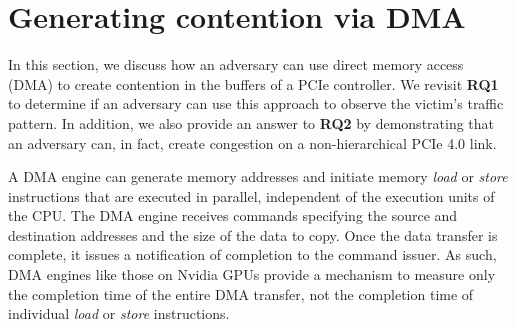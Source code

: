 \section{Generating contention via DMA}
\label{sec:interconnect-sc-dma}

In this section, we discuss how an adversary can use direct memory access (DMA) to create contention in the buffers of a PCIe controller.
We revisit \textbf{RQ1} to determine if an adversary can use this approach to observe the victim's traffic pattern. 
In addition, we also provide an answer to \textbf{RQ2} by demonstrating that an adversary can, in fact, create congestion on a non-hierarchical PCIe 4.0 link.

A DMA engine can generate memory addresses and initiate memory \textit{load} or \textit{store} instructions that are executed in parallel, independent of the execution units of the CPU.
The DMA engine receives commands specifying the source and destination addresses and the size of the data to copy.
Once the data transfer is complete, it issues a notification of completion to the command issuer.
As such, DMA engines like those on Nvidia GPUs provide a mechanism to measure only the completion time of the entire DMA transfer, not the completion time of individual \textit{load} or \textit{store} instructions.


